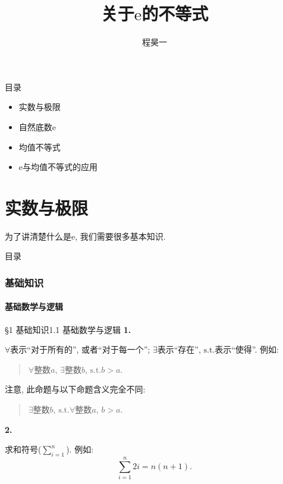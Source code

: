 \documentclass[serif]{beamer}
\title{关于$\mathrm{e}$的不等式}
\author{程昊一}
\date{}
\begin{document}
\setlength\abovedisplayskip{0.2cm}
\setlength\belowdisplayskip{0.2cm}

\begin{frame}
	\maketitle
\end{frame}

\begin{frame}{目录}
	\begin{itemize}
		\item 实数与极限
		\item 自然底数$\mathrm{e}$
		\item 均值不等式
		\item $\mathrm{e}$与均值不等式的应用
	\end{itemize}
\end{frame}

\part{实数与极限}

\begin{frame}
	\partpage
	\noindent\begin{center}
		\kaishu 为了讲清楚什么是$\mathrm{e}$, 我们需要很多基本知识.
	\end{center}
\end{frame}

\begin{frame}{目录}
	\begin{multicols}{2}
		\tableofcontents
	\end{multicols}
\end{frame}

\section{\heiti 基础知识}
\subsection{\kaishu 基础数学与逻辑}

\begin{frame}{\S1 基础知识}{1.1 基础数学与逻辑}
	\noindent\textbf{1.}\par
	$\forall$表示“对于所有的”, 或者“对于每一个”; $\exists$表示“存在”, $\mathrm{s.t.}$表示“使得”. 例如: \par
	\begin{quotation}
		$\forall$整数$a$, $\exists$整数$b$, $\mathrm{s.t.}b>a$.
	\end{quotation}
	注意, 此命题与以下命题含义完全不同: 
	\begin{quotation}
		$\exists$整数$b$, $\mathrm{s.t.}\forall$整数$a$, $b>a$.
	\end{quotation}
	\noindent\textbf{2.}\par
	求和符号($\sum_{i=1}^n$). 例如:
	\[\sum\limits_{i=1}^{n}2i=n(n+1).\]
\end{frame}
\end{document}
